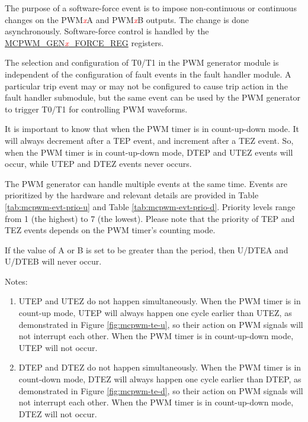 \documentclass[main\_\_EN.tex]{subfiles}
\begin{document}
The purpose of a software-force event is to impose non-continuous or continuous changes on the PWM\textcolor{red}{\it{x}}A and PWM\textcolor{red}{\it{x}}B outputs. The change is done asynchronously. Software-force control is handled by the\\ \hyperref[regdesc:MCPWMGEN0FORCEREG]{MCPWM\_GEN\textcolor{red}{\it{x}}\_FORCE\_REG} registers.

The selection and configuration of T0/T1 in the PWM generator module is independent of the configuration of fault events in the fault handler module. A particular trip event may or may not be configured to cause trip action in the fault handler submodule, but the same event can be used by the PWM generator to trigger T0/T1 for controlling PWM waveforms.

It is important to know that when the PWM timer is in count-up-down mode. It will always decrement after a TEP event, and increment after a TEZ event. So, when the PWM timer is in count-up-down mode, DTEP and UTEZ events will occur, while UTEP and DTEZ events never occurs.

The PWM generator can handle multiple events at the same time. Events are prioritized by the hardware and relevant details are provided in Table \ref{tab:mcpwm-evt-prio-u} and Table \ref{tab:mcpwm-evt-prio-d}. Priority levels range from 1 (the highest) to 7 (the lowest). Please note that the priority of TEP and TEZ events depends on the PWM timer's counting mode.

If the value of A or B is set to be greater than the period, then U/DTEA and U/DTEB will never occur.




Notes:
\begin{enumerate}
   \item UTEP and UTEZ do not happen simultaneously. When the PWM timer is in count-up mode, UTEP will always happen one cycle earlier than UTEZ, as demonstrated in Figure \ref{fig:mcpwm-te-u}, so their action on PWM signals will not interrupt each other. When the PWM timer is in count-up-down mode, UTEP will not occur.
    \item DTEP and DTEZ do not happen simultaneously. When the PWM timer is in count-down mode, DTEZ will always happen one cycle earlier than DTEP, as demonstrated in Figure \ref{fig:mcpwm-te-d}, so their action on PWM signals will not interrupt each other. When the PWM timer is in count-up-down mode, DTEZ will not occur. 
\end{enumerate}
\end{document}
